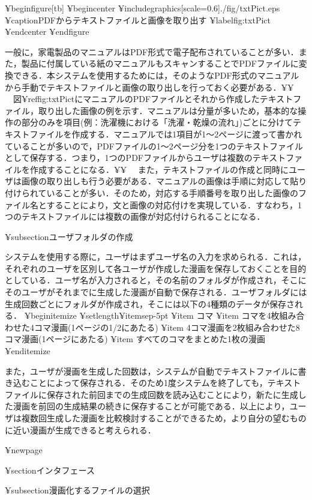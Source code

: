 ¥begin{figure}[tb]
 ¥begin{center}
  ¥includegraphics[scale=0.6]{./fig/txtPict.eps}
  ¥caption{PDFからテキストファイルと画像を取り出す}
  ¥label{fig:txtPict}
 ¥end{center}
¥end{figure}

一般に，家電製品のマニュアルはPDF形式で電子配布されていることが多い．また，製品に付属している紙のマニュアルもスキャンすることでPDFファイルに変換できる．本システムを使用するためには，そのようなPDF形式のマニュアルから手動でテキストファイルと画像の取り出しを行っておく必要がある．¥¥
　図¥ref{fig:txtPict}にマニュアルのPDFファイルとそれから作成したテキストファイル，取り出した画像の例を示す．マニュアルは分量が多いため，基本的な操作の部分のみを項目(例：洗濯機における「洗濯・乾燥の流れ」)ごとに分けてテキストファイルを作成する．マニュアルでは1項目が1〜2ページに渡って書かれていることが多いので，PDFファイルの1〜2ページ分を1つのテキストファイルとして保存する．つまり，1つのPDFファイルからユーザは複数のテキストファイルを作成することになる．¥¥
　また，テキストファイルの作成と同時にユーザは画像の取り出しも行う必要がある．マニュアルの画像は手順に対応して貼り付けられていることが多い．そのため，対応する手順番号を取り出した画像のファイル名とすることにより，文と画像の対応付けを実現している．すなわち，1つのテキストファイルには複数の画像が対応付けられることになる．

¥subsection{ユーザフォルダの作成}

システムを使用する際に，ユーザはまずユーザ名の入力を求められる．これは，それぞれのユーザを区別して各ユーザが作成した漫画を保存しておくことを目的としている．ユーザ名が入力されると，その名前のフォルダが作成され，そこにそのユーザがそれまでに生成した漫画が自動で保存される．ユーザフォルダには生成回数ごとにフォルダが作成され，そこには以下の4種類のデータが保存される．
¥begin{itemize}
¥setlength{¥itemsep}{-5pt}
¥item コマ
¥item コマを4枚組み合わせた4コマ漫画(1ページの1/2にあたる)
¥item 4コマ漫画を2枚組み合わせた8コマ漫画(1ページにあたる)
¥item すべてのコマをまとめた1枚の漫画
¥end{itemize}

また，ユーザが漫画を生成した回数は，システムが自動でテキストファイルに書き込むことによって保存される．そのため1度システムを終了しても，テキストファイルに保存された前回までの生成回数を読み込むことにより，新たに生成した漫画を前回の生成結果の続きに保存することが可能である．以上により，ユーザは複数回生成した漫画を比較検討することができるため，より自分の望むものに近い漫画が生成できると考えられる．

¥newpage

¥section{インタフェース}

¥subsection{漫画化するファイルの選択}

